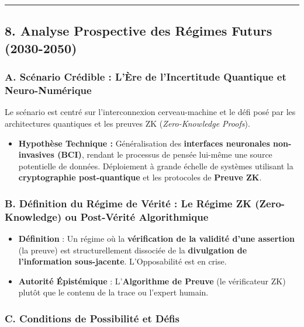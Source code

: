 \documentclass[memoire, 12pt]{report}
\begin{document}
\hrule
\subsection*{8. Analyse Prospective des Régimes Futurs (2030-2050)}
\subsubsection*{A. Scénario Crédible : L'Ère de l'Incertitude Quantique et Neuro-Numérique}
Le scénario est centré sur l'interconnexion cerveau-machine et le défi posé par les architectures quantiques et les preuves ZK (\textit{Zero-Knowledge Proofs}).

\begin{itemize}
    \item \textbf{Hypothèse Technique :} Généralisation des \textbf{interfaces neuronales non-invasives (BCI)}, rendant le processus de pensée lui-même une source potentielle de données. Déploiement à grande échelle de systèmes utilisant la \textbf{cryptographie post-quantique} et les protocoles de \textbf{Preuve ZK}.
\end{itemize}

\subsubsection*{B. Définition du Régime de Vérité : Le Régime ZK (Zero-Knowledge) ou Post-Vérité Algorithmique}
\begin{itemize}
    \item \textbf{Définition} : Un régime où la \textbf{vérification de la validité d'une assertion} (la preuve) est structurellement dissociée de la \textbf{divulgation de l'information sous-jacente}. L'Opposabilité est en crise.
    \item \textbf{Autorité Épistémique} : L'\textbf{Algorithme de Preuve} (le vérificateur ZK) plutôt que le contenu de la trace ou l'expert humain.
\end{itemize}

\subsubsection*{C. Conditions de Possibilité et Défis}
\end{document}
